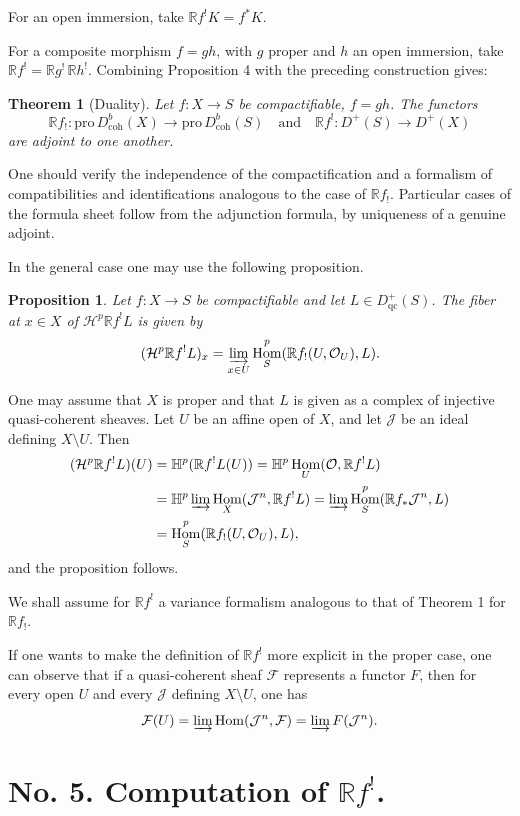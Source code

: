 \documentclass[12pt]{amsart}
\theoremstyle{plain}
\newtheorem{prop}{Proposition}
\newtheorem{thm}{Theorem}
\theoremstyle{definition}
\DeclareMathOperator{\Hom}{Hom}
\newcommand{\Pro}{\text{pro}\,}
\newcommand{\coh}{\text{coh}}
\newcommand{\cF}{\mathcal{F}}
\newcommand{\cH}{\mathcal{H}}
\newcommand{\cJ}{\mathcal{J}}
\newcommand{\cO}{\mathcal{O}}
\newcommand{\cDb}{D^{b}}
\newcommand{\cD}{D}
\newcommand{\bH}{\mathbb{H}}
\newcommand{\bR}{\mathbb{R}}
\begin{document}
For an open immersion, take $\bR f^!K=f^*K$.

For a composite morphism $f=gh$, with $g$ proper and $h$ an open immersion, take $\bR f^!=\bR g^!\,\bR h^!$. Combining Proposition 4 with the preceding construction gives:

\begin{thm}[Duality]
Let $f:X\to S$ be compactifiable, $f=gh$. The functors
\[
\bR f_!:\Pro\cDb_{\coh}(X)\to\Pro\cDb_{\coh}(S)
\quad\text{and}\quad
\bR f^!:\cD^+(S)\to\cD^+(X)
\]
are adjoint to one another.
\end{thm}

One should verify the independence of the compactification and a formalism of compatibilities and identifications analogous to the case of $\bR f_!$. Particular cases of the formula sheet follow from the adjunction formula, by uniqueness of a genuine adjoint.

In the general case one may use the following proposition.

\begin{prop}
Let $f:X\to S$ be compactifiable and let $L\in\cD^+_{\mathrm{qc}}(S)$. The fiber at $x\in X$ of $\cH^p\bR f^!L$ is given by
\[
(\cH^p\bR f^!L)_x=\varinjlim_{x\in U}\Hom^p_S(\bR f_!(U,\cO_U),L).
\]
\end{prop}

One may assume that $X$ is proper and that $L$ is given as a complex of injective quasi-coherent sheaves. Let $U$ be an affine open of $X$, and let $\cJ$ be an ideal defining $X\setminus U$. Then
\begin{align*}
(\cH^p\bR f^!L)(U)&=\bH^p(\bR f^!L(U))=\bH^p\Hom_U(\cO,\bR f^!L)\\
&=\bH^p\varinjlim\Hom_X(\cJ^n,\bR f^!L)=\varinjlim\Hom^p_S(\bR f_*\cJ^n,L)\\
&=\Hom^p_S(\bR f_!(U,\cO_U),L),
\end{align*}
and the proposition follows.

We shall assume for $\bR f^!$ a variance formalism analogous to that of Theorem 1 for $\bR f_!$.

If one wants to make the definition of $\bR f^!$ more explicit in the proper case, one can observe that if a quasi-coherent sheaf $\cF$ represents a functor $F$, then for every open $U$ and every $\cJ$ defining $X\setminus U$, one has
\[
\cF(U)=\varinjlim\Hom(\cJ^n,\cF)=\varinjlim F(\cJ^n).
\]

\section*{No. 5. Computation of $\bR f^!$.}
\end{document}
